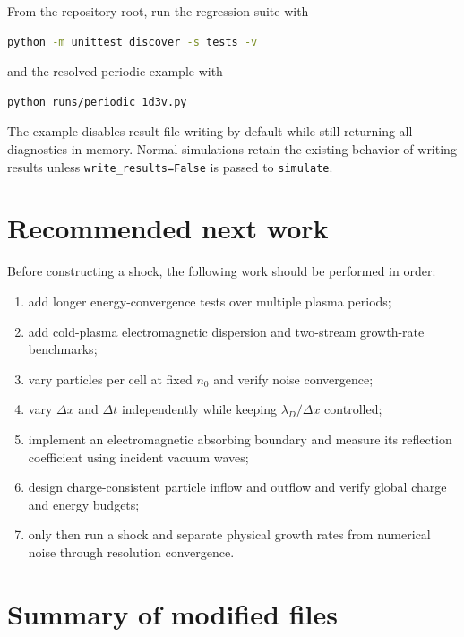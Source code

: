 \documentclass[11pt,a4paper]{article}
\newcommand{\code}[1]{\texttt{#1}}
\begin{document}
From the repository root, run the regression suite with
\begin{lstlisting}[language=bash]
python -m unittest discover -s tests -v
\end{lstlisting}
and the resolved periodic example with
\begin{lstlisting}[language=bash]
python runs/periodic_1d3v.py
\end{lstlisting}

The example disables result-file writing by default while still returning all
diagnostics in memory.  Normal simulations retain the existing behavior of
writing results unless \code{write\_results=False} is passed to
\code{simulate}.

\section{Recommended next work}

Before constructing a shock, the following work should be performed in order:
\begin{enumerate}
  \item add longer energy-convergence tests over multiple plasma periods;
  \item add cold-plasma electromagnetic dispersion and two-stream growth-rate
        benchmarks;
  \item vary particles per cell at fixed $n_0$ and verify noise convergence;
  \item vary $\Delta x$ and $\Delta t$ independently while keeping
        $\lambda_D/\Delta x$ controlled;
  \item implement an electromagnetic absorbing boundary and measure its
        reflection coefficient using incident vacuum waves;
  \item design charge-consistent particle inflow and outflow and verify global
        charge and energy budgets;
  \item only then run a shock and separate physical growth rates from numerical
        noise through resolution convergence.
\end{enumerate}

\appendix
\section{Summary of modified files}
\end{document}
